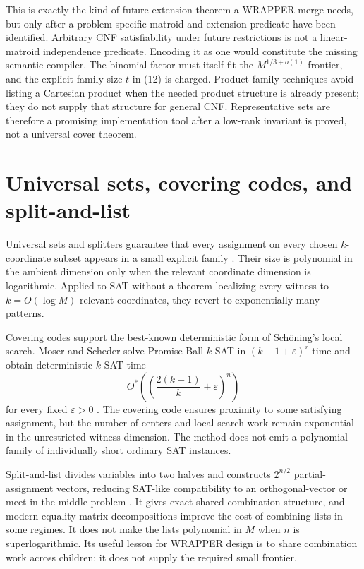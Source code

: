 \documentclass[11pt]{article}
\begin{document}
This is exactly the kind of future-extension theorem a WRAPPER merge needs,
but only after a problem-specific matroid and extension predicate have been
identified.  Arbitrary CNF satisfiability under future restrictions is not a
linear-matroid independence predicate.  Encoding it as one would constitute
the missing semantic compiler.  The binomial factor must itself fit the
$M^{1/3+o(1)}$ frontier, and the explicit family size $t$ in (12) is charged.
Product-family techniques avoid listing a Cartesian product when the needed
product structure is already present; they do not supply that structure for
general CNF.  Representative sets are therefore a promising implementation
tool after a low-rank invariant is proved, not a universal cover theorem.

\section{Universal sets, covering codes, and split-and-list}

Universal sets and splitters guarantee that every assignment on every
chosen $k$-coordinate subset appears in a small explicit family
\cite{naorschulmansrinivasan1995}.  Their size is polynomial in the ambient
dimension only when the relevant coordinate dimension is logarithmic.
Applied to SAT without a theorem localizing every witness to
$k=O(\log M)$ relevant coordinates, they revert to exponentially many
patterns.

Covering codes support the best-known deterministic form of Sch\"oning's
local search.  Moser and Scheder solve Promise-Ball-$k$-SAT in
$(k-1+\varepsilon)^r$ time and obtain deterministic $k$-SAT time
\[
 O^*\!\left(\left(\frac{2(k-1)}{k}+\varepsilon\right)^n\right)
 \tag{13}
\]
for every fixed $\varepsilon>0$ \cite{moserscheder2011}.  The covering code
ensures proximity to some satisfying assignment, but the number of centers
and local-search work remain exponential in the unrestricted witness
dimension.  The method does not emit a polynomial family of individually
short ordinary SAT instances.

Split-and-list divides variables into two halves and constructs
$2^{n/2}$ partial-assignment vectors, reducing SAT-like compatibility to an
orthogonal-vector or meet-in-the-middle problem
\cite{patrascuwilliams2010}.  It gives exact shared combination structure,
and modern equality-matrix decompositions improve the cost of combining
lists in some regimes.  It does not make the lists polynomial in $M$ when
$n$ is superlogarithmic.  Its useful lesson for WRAPPER design is to share
combination work across children; it does not supply the required small
frontier.
\end{document}
